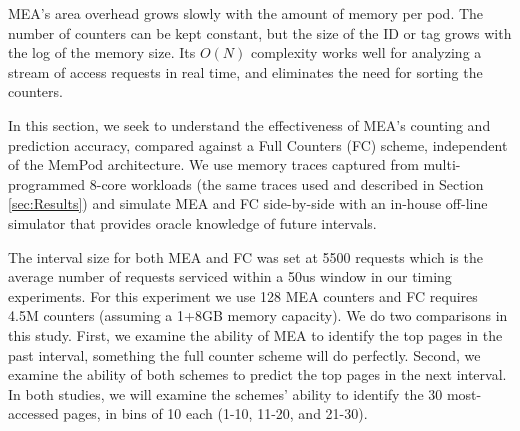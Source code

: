 MEA's area overhead grows slowly with the amount of memory per pod.  The 
number of counters can be kept constant, but the size of the 
ID or tag grows with the log of the memory size.
Its $O(N)$ complexity works well for analyzing a stream of access requests in real time, and eliminates the need for sorting the counters.



In this section, we seek to understand the effectiveness of MEA's counting 
and prediction accuracy, compared against a Full Counters (FC) scheme,
independent of the MemPod architecture. We use memory traces captured 
from multi-programmed 8-core workloads (the same traces used and described in Section \ref{sec:Results}) and simulate MEA and FC side-by-side with an in-house off-line simulator that provides oracle knowledge of future intervals. 

The interval size for both MEA and FC was set at 5500 requests which is the average number of requests serviced within a 50us window in our timing experiments. For this experiment we use 128 MEA counters and FC requires 4.5M counters (assuming a 1+8GB memory capacity). 
We do two comparisons in this study.  First, we examine the ability of MEA
to identify the top pages in the past interval, something the full counter
scheme will do perfectly.  Second, we examine the ability of both schemes
to predict the top pages in the next interval.  In both studies, we will
examine the schemes' ability to identify the 30 most-accessed pages, in
bins of 10 each (1-10, 11-20, and 21-30).

